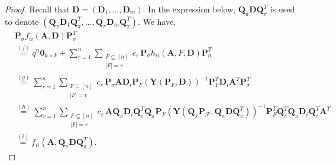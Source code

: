 \documentclass[journal,draftcls,onecolumn]{IEEEtran}
\theoremstyle{mystyle}
\newcommand{\bfD}{\mathbf{D}}
\newcommand{\bfQ}{\mathbf{Q}}
\newcommand{\bfY}{\mathbf{Y}}
\newcommand{\bfP}{\mathbf{P}}
\newcommand{\cF}{\mathcal{F}}
\begin{document}
\begin{proof}
Recall that $\mathbf{D} = (\mathbf{D}_1, \dots, \mathbf{D}_m)$. In the expression below, $\mathbf{Q}_{\pi} \mathbf{D} \mathbf{Q}_{\pi}^T$ is used to denote $(\mathbf{Q}_{\pi} \mathbf{D}_1 \mathbf{Q}_{\pi}^T, \dots, \mathbf{Q}_{\pi} \mathbf{D}_m \mathbf{Q}_{\pi}^T)$. We have,
\begin{align*}
&\mathbf{P}_{\sigma} f_{ii}( \mathbf{A}, \mathbf{D}) \mathbf{P}_{\sigma}^T\\
& \overset{(f)}= q^n \mathbf{0}_{k \times k} + \sum_{r = 1}^n 
    \sum_{\substack{F \subseteq [n] \\ |F| = r}} c_r \, \mathbf{P}_{\sigma} h_{ii}(\mathbf{A}, F, \mathbf{D}) \mathbf{P}_{\sigma}^T\\
& \overset{(g)}=  \sum_{r = 1}^n 
    \sum_{\substack{F \subseteq [n]\\ |F| = r}} 
    c_r \,
    \mathbf{P}_{\sigma} \mathbf{A}\mathbf{D}_i\mathbf{P}_{F} (\bfY(\bfP_{F}, \bfD))^{-1}
    \mathbf{P}_{F}^T  \mathbf{D}_i\mathbf{A}^T\mathbf{P}_{\sigma}^T\\[0.5em]
& \overset{(h)}=  \sum_{r = 1}^n 
    \sum_{\substack{F \subseteq [n]\\ |F| = r}} 
    c_r \,
    \mathbf{A}\mathbf{Q}_{\pi}\mathbf{D}_i\mathbf{Q}_{\pi}^T\mathbf{Q}_{\pi}\mathbf{P}_{F} (\bfY(\bfQ_{\pi}\bfP_{\cF}, \bfQ_{\pi}\bfD \bfQ_{\pi}^T))^{-1}
    \mathbf{P}_{F}^T\mathbf{Q}_{\pi}^T\mathbf{Q}_{\pi}  
    \mathbf{D}_i \mathbf{Q}_{\pi}^T\mathbf{A}^T\\[0.5em]
& \overset{(i)}=  f_{ii}(\mathbf{A}, \mathbf{Q}_{\pi}\mathbf{D} \mathbf{Q}_{\pi}^T).
\end{align*}




\end{proof}
\end{document}
